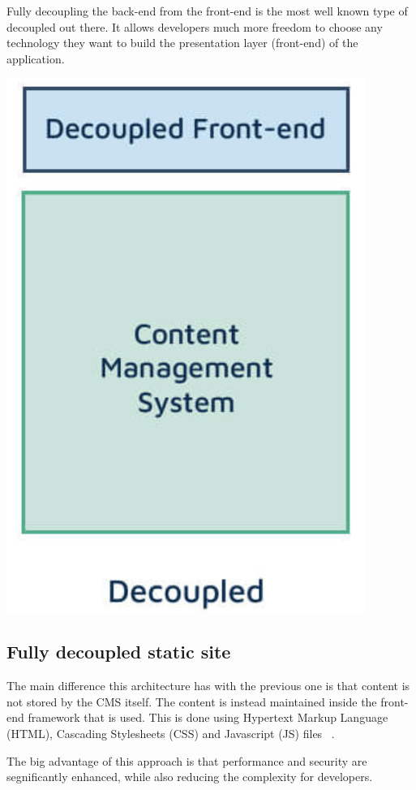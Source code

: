 Fully decoupling the back-end from the front-end is the most well known type of decoupled out there. It allows developers much more freedom to choose any technology they want to build the presentation layer (front-end) of the application.

\includegraphics{./img/Headless_Architecture}

\subsection{Fully decoupled static site}

The main difference this architecture has with the previous one is that content is not stored by the CMS itself. The content is instead maintained inside the front-end framework that is used. This is done using Hypertext Markup Language (HTML), Cascading Stylesheets (CSS) and Javascript (JS) files ~\autocite{Dropsolid2021}.

The big advantage of this approach is that performance and security are segnificantly enhanced, while also reducing the complexity for developers.

